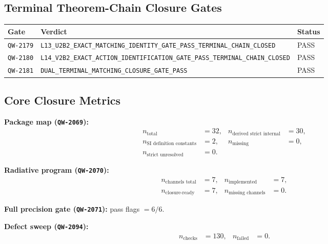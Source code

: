 \documentclass[11pt,a4paper]{article}
\newcommand{\QW}[1]{\texttt{QW-#1}}
\newcommand{\Verdict}[1]{\texttt{#1}}
\begin{document}
\subsection{Terminal Theorem-Chain Closure Gates}
\begin{center}
\begin{tabular}{p{2.2cm}p{8.8cm}p{2.6cm}}
\toprule
\textbf{Gate} & \textbf{Verdict} & \textbf{Status} \\
\midrule
\QW{2179} & \Verdict{L13\_U2B2\_EXACT\_MATCHING\_IDENTITY\_GATE\_PASS\_TERMINAL\_CHAIN\_CLOSED} & PASS \\
\QW{2180} & \Verdict{L14\_V2B2\_EXACT\_ACTION\_IDENTIFICATION\_GATE\_PASS\_TERMINAL\_CHAIN\_CLOSED} & PASS \\
\QW{2181} & \Verdict{DUAL\_TERMINAL\_MATCHING\_CLOSURE\_GATE\_PASS} & PASS \\
\bottomrule
\end{tabular}
\end{center}

\subsection{Core Closure Metrics}
\textbf{Package map (\QW{2069}):}
\begin{align*}
 n_{\text{total}} &= 32, & n_{\text{derived strict internal}} &= 30, \\
 n_{\text{SI definition constants}} &= 2, & n_{\text{missing}} &= 0, \\
 n_{\text{strict unresolved}} &= 0.
\end{align*}

\textbf{Radiative program (\QW{2070}):}
\begin{align*}
 n_{\text{channels total}} &= 7, & n_{\text{implemented}} &= 7, \\
 n_{\text{closure-ready}} &= 7, & n_{\text{missing channels}} &= 0.
\end{align*}

\textbf{Full precision gate (\QW{2071}):} pass flags $=6/6$.

\textbf{Defect sweep (\QW{2094}):}
\begin{align*}
 n_{\text{checks}} &= 130, & n_{\text{failed}} &= 0.
\end{align*}
\end{document}
